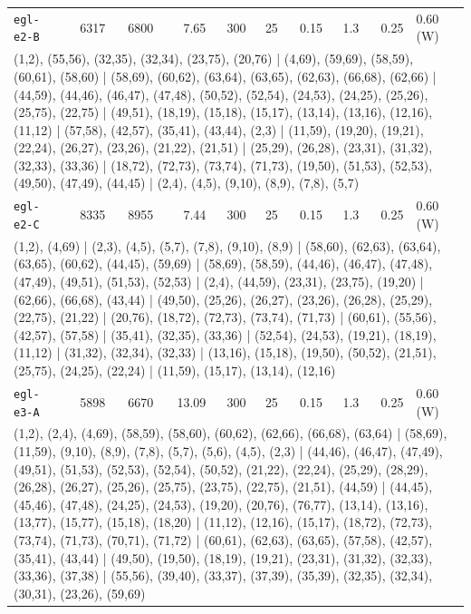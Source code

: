 \begin{longtable}{lrrrrrrrrl}
\texttt{egl-e2-B} & 6317 & 6800 & 7.65 & 300 & 25 & 0.15 & 1.3 & 0.25 & 0.60\,(W) \\
\multicolumn{10}{p{0.96\linewidth}}{\tiny\raggedright\arraybackslash (1,2), (55,56), (32,35), (32,34), (23,75), (20,76) | (4,69), (59,69), (58,59), (60,61), (58,60) | (58,69), (60,62), (63,64), (63,65), (62,63), (66,68), (62,66) | (44,59), (44,46), (46,47), (47,48), (50,52), (52,54), (24,53), (24,25), (25,26), (25,75), (22,75) | (49,51), (18,19), (15,18), (15,17), (13,14), (13,16), (12,16), (11,12) | (57,58), (42,57), (35,41), (43,44), (2,3) | (11,59), (19,20), (19,21), (22,24), (26,27), (23,26), (21,22), (21,51) | (25,29), (26,28), (23,31), (31,32), (32,33), (33,36) | (18,72), (72,73), (73,74), (71,73), (19,50), (51,53), (52,53), (49,50), (47,49), (44,45) | (2,4), (4,5), (9,10), (8,9), (7,8), (5,7)} \\[2pt]
\texttt{egl-e2-C} & 8335 & 8955 & 7.44 & 300 & 25 & 0.15 & 1.3 & 0.25 & 0.60\,(W) \\
\multicolumn{10}{p{0.96\linewidth}}{\tiny\raggedright\arraybackslash (1,2), (4,69) | (2,3), (4,5), (5,7), (7,8), (9,10), (8,9) | (58,60), (62,63), (63,64), (63,65), (60,62), (44,45), (59,69) | (58,69), (58,59), (44,46), (46,47), (47,48), (47,49), (49,51), (51,53), (52,53) | (2,4), (44,59), (23,31), (23,75), (19,20) | (62,66), (66,68), (43,44) | (49,50), (25,26), (26,27), (23,26), (26,28), (25,29), (22,75), (21,22) | (20,76), (18,72), (72,73), (73,74), (71,73) | (60,61), (55,56), (42,57), (57,58) | (35,41), (32,35), (33,36) | (52,54), (24,53), (19,21), (18,19), (11,12) | (31,32), (32,34), (32,33) | (13,16), (15,18), (19,50), (50,52), (21,51), (25,75), (24,25), (22,24) | (11,59), (15,17), (13,14), (12,16)} \\[2pt]
\texttt{egl-e3-A} & 5898 & 6670 & 13.09 & 300 & 25 & 0.15 & 1.3 & 0.25 & 0.60\,(W) \\
\multicolumn{10}{p{0.96\linewidth}}{\tiny\raggedright\arraybackslash (1,2), (2,4), (4,69), (58,59), (58,60), (60,62), (62,66), (66,68), (63,64) | (58,69), (11,59), (9,10), (8,9), (7,8), (5,7), (5,6), (4,5), (2,3) | (44,46), (46,47), (47,49), (49,51), (51,53), (52,53), (52,54), (50,52), (21,22), (22,24), (25,29), (28,29), (26,28), (26,27), (25,26), (25,75), (23,75), (22,75), (21,51), (44,59) | (44,45), (45,46), (47,48), (24,25), (24,53), (19,20), (20,76), (76,77), (13,14), (13,16), (13,77), (15,77), (15,18), (18,20) | (11,12), (12,16), (15,17), (18,72), (72,73), (73,74), (71,73), (70,71), (71,72) | (60,61), (62,63), (63,65), (57,58), (42,57), (35,41), (43,44) | (49,50), (19,50), (18,19), (19,21), (23,31), (31,32), (32,33), (33,36), (37,38) | (55,56), (39,40), (33,37), (37,39), (35,39), (32,35), (32,34), (30,31), (23,26), (59,69)} \\[2pt]

\end{longtable}
